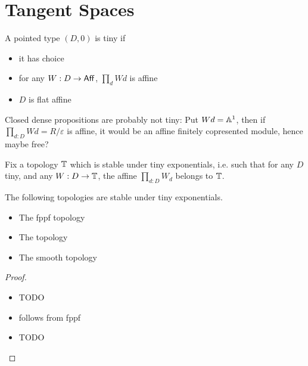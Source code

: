 \section{Tangent Spaces}
\begin{definition}
	A pointed type $(D,0)$ is tiny if
	\begin{itemize}	
		\item it has choice
		\item for any $W : D \to \mathsf{Aff}$, $\prod_d W d$ is affine
		\item $D$ is flat affine %
	\end{itemize}
\end{definition}
\begin{rmk}
	Closed dense propositions are probably not tiny: Put $W	d = \mathbb{A}^1$, then if $\prod_{d: D} W d = R / \varepsilon$ is affine, it would be an affine finitely copresented module, hence maybe free?
\end{rmk}
Fix a topology $\mathbb{T}$ which is stable under tiny exponentials, i.e. such that for any $D$ tiny, and any $W : D \to \mathbb{T}$, the affine $\prod_{d:D} W_d$ belongs to $\mathbb{T}$.
\begin{lemma}[TODO]{\label{lemma:TinyExp}}
	The following topologies are stable under tiny exponentials.
	\begin{itemize}
		\item 	The fppf topology
		\item The \etale topology
		\item The smooth topology				
	\end{itemize}
	
\end{lemma}
\begin{proof}
	\begin{itemize}
		\item TODO
		\item \etale follows from fppf
		\item TODO
	\end{itemize}
\end{proof}

